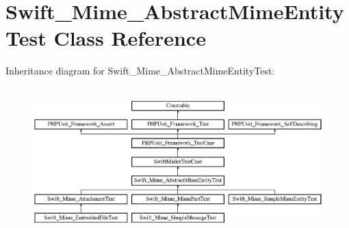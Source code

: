 \section{Swift\+\_\+\+Mime\+\_\+\+Abstract\+Mime\+Entity\+Test Class Reference}
\label{class_swift___mime___abstract_mime_entity_test}
Inheritance diagram for Swift\+\_\+\+Mime\+\_\+\+Abstract\+Mime\+Entity\+Test\+:\begin{figure}[H]
\begin{center}
\leavevmode
\includegraphics[height=5.781711cm]{class_swift___mime___abstract_mime_entity_test}
\end{center}
\end{figure}
